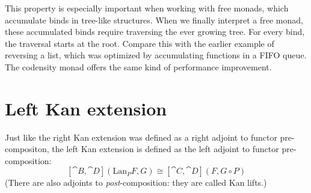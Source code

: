 \documentclass[DaoFP]{subfiles}
\begin{document}
This property is especially important when working with free monads, which accumulate binds in tree-like structures. When we finally interpret a free monad, these accumulated binds require traversing the ever growing tree. For every bind, the traversal starts at the root. Compare this with the earlier example of reversing a list, which was optimized by accumulating functions in a FIFO queue. The codensity monad offers the same kind of performance improvement.

\section{Left Kan extension}

Just like the right Kan extension was defined as a right adjoint to functor pre-compositon, the left Kan extension is defined as the left adjoint to functor pre-composition:
\[ [\cat B, \cat D](\text{Lan}_P F , G) \cong  [\cat C, \cat D] (F, G \circ P) \]
 (There are also adjoints to \emph{post}-composition: they are called Kan lifts.)
\end{document}
